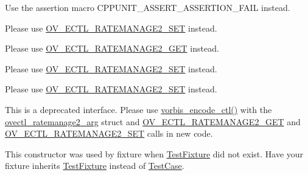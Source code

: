 \begin{DoxyRefList}
Use the assertion macro C\+P\+P\+U\+N\+I\+T\+\_\+\+A\+S\+S\+E\+R\+T\+\_\+\+A\+S\+S\+E\+R\+T\+I\+O\+N\+\_\+\+F\+A\+I\+L instead.  
\item[\label{deprecated__deprecated000026}%
\hypertarget{deprecated__deprecated000026}{}%
Member \hyperlink{vorbisenc_8h_a34c3170d227b6368041e59c1dc7ed6e4}{O\+V\+\_\+\+E\+C\+T\+L\+\_\+\+R\+A\+T\+E\+M\+A\+N\+A\+G\+E\+\_\+\+A\+V\+G} ]Please use \hyperlink{vorbisenc_8h_a5075e0acb85fd45398a290594f83d6ba}{O\+V\+\_\+\+E\+C\+T\+L\+\_\+\+R\+A\+T\+E\+M\+A\+N\+A\+G\+E2\+\_\+\+S\+E\+T} instead. 
\item[\label{deprecated__deprecated000024}%
\hypertarget{deprecated__deprecated000024}{}%
Member \hyperlink{vorbisenc_8h_a614481c0d84bdfbb80eed9208b68f779}{O\+V\+\_\+\+E\+C\+T\+L\+\_\+\+R\+A\+T\+E\+M\+A\+N\+A\+G\+E\+\_\+\+G\+E\+T} ]Please use \hyperlink{vorbisenc_8h_af95048070bedb467f80ce85e20057126}{O\+V\+\_\+\+E\+C\+T\+L\+\_\+\+R\+A\+T\+E\+M\+A\+N\+A\+G\+E2\+\_\+\+G\+E\+T} instead. 
\item[\label{deprecated__deprecated000027}%
\hypertarget{deprecated__deprecated000027}{}%
Member \hyperlink{vorbisenc_8h_af8869980a805f431af57a50dffbf5d33}{O\+V\+\_\+\+E\+C\+T\+L\+\_\+\+R\+A\+T\+E\+M\+A\+N\+A\+G\+E\+\_\+\+H\+A\+R\+D} ]Please use \hyperlink{vorbisenc_8h_a5075e0acb85fd45398a290594f83d6ba}{O\+V\+\_\+\+E\+C\+T\+L\+\_\+\+R\+A\+T\+E\+M\+A\+N\+A\+G\+E2\+\_\+\+S\+E\+T} instead. 
\item[\label{deprecated__deprecated000025}%
\hypertarget{deprecated__deprecated000025}{}%
Member \hyperlink{vorbisenc_8h_a1daa1fd8ce1064cce01dde3ad447d389}{O\+V\+\_\+\+E\+C\+T\+L\+\_\+\+R\+A\+T\+E\+M\+A\+N\+A\+G\+E\+\_\+\+S\+E\+T} ]Please use \hyperlink{vorbisenc_8h_a5075e0acb85fd45398a290594f83d6ba}{O\+V\+\_\+\+E\+C\+T\+L\+\_\+\+R\+A\+T\+E\+M\+A\+N\+A\+G\+E2\+\_\+\+S\+E\+T} instead. 
\item[\label{deprecated__deprecated000023}%
\hypertarget{deprecated__deprecated000023}{}%
Class \hyperlink{structovectl__ratemanage__arg}{ovectl\+\_\+ratemanage\+\_\+arg} ]This is a deprecated interface. Please use \hyperlink{vorbisenc_8h_a5f398a378e20b8ce5e3341a582e773bd}{vorbis\+\_\+encode\+\_\+ctl()} with the \hyperlink{structovectl__ratemanage2__arg}{ovectl\+\_\+ratemanage2\+\_\+arg} struct and \hyperlink{vorbisenc_8h_af95048070bedb467f80ce85e20057126}{O\+V\+\_\+\+E\+C\+T\+L\+\_\+\+R\+A\+T\+E\+M\+A\+N\+A\+G\+E2\+\_\+\+G\+E\+T} and \hyperlink{vorbisenc_8h_a5075e0acb85fd45398a290594f83d6ba}{O\+V\+\_\+\+E\+C\+T\+L\+\_\+\+R\+A\+T\+E\+M\+A\+N\+A\+G\+E2\+\_\+\+S\+E\+T} calls in new code. 
\item[\label{deprecated__deprecated000008}%
\hypertarget{deprecated__deprecated000008}{}%
Member \hyperlink{class_test_case_ac62aa15cb45a40bdc0b9a1c6554c7e0a}{Test\+Case\+:\+:Test\+Case} ()]This constructor was used by fixture when \hyperlink{class_test_fixture}{Test\+Fixture} did not exist. Have your fixture inherits \hyperlink{class_test_fixture}{Test\+Fixture} instead of \hyperlink{class_test_case}{Test\+Case}.




\end{DoxyRefList}
